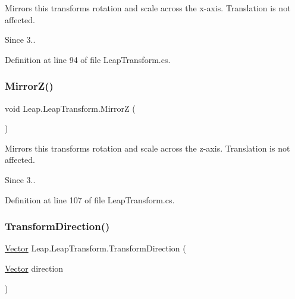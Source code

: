 Mirrors this transform\textquotesingle{}s rotation and scale across the x-\/axis. Translation is not affected. 

\begin{DoxySince}{Since}
3.. 
\end{DoxySince}


Definition at line 94 of file Leap\+Transform.\+cs.

\mbox{\label{struct_leap_1_1_leap_transform_a699bd459e338da85f1ee7c2de9e466de}} 
\subsubsection{\texorpdfstring{MirrorZ()}{MirrorZ()}}
{\footnotesize\ttfamily void Leap.\+Leap\+Transform.\+MirrorZ (\begin{DoxyParamCaption}{ }\end{DoxyParamCaption})}



Mirrors this transform\textquotesingle{}s rotation and scale across the z-\/axis. Translation is not affected. 

\begin{DoxySince}{Since}
3.. 
\end{DoxySince}


Definition at line 107 of file Leap\+Transform.\+cs.

\mbox{\label{struct_leap_1_1_leap_transform_a05c90f4a484f3b55e415c0e203f78870}} 
\subsubsection{\texorpdfstring{TransformDirection()}{TransformDirection()}}
{\footnotesize\ttfamily \mbox{\hyperlink{struct_leap_1_1_vector}{Vector}} Leap.\+Leap\+Transform.\+Transform\+Direction (\begin{DoxyParamCaption}\item[{\mbox{\hyperlink{struct_leap_1_1_vector}{Vector}}}]{direction }\end{DoxyParamCaption})}



